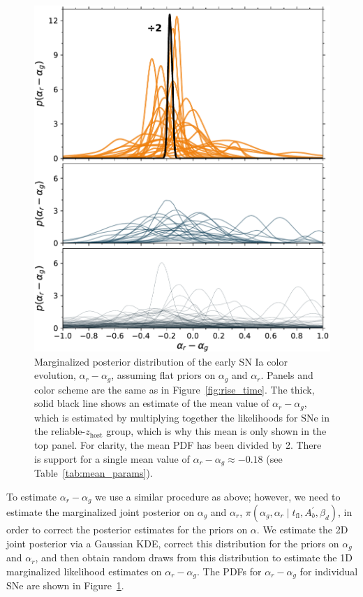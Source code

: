 \documentclass[twocolumn]{./aastex63}
\begin{document}
\begin{figure}
    \centering
    \includegraphics[width=1\linewidth]{./figures/delta.pdf}
    \caption{Marginalized posterior distribution of the early SN Ia color
    evolution, $\alpha_r - \alpha_g$, assuming flat priors on $\alpha_g$ and
    $\alpha_r$. Panels and color scheme are the same as in
    Figure~\ref{fig:rise_time}. The thick, solid black line shows an estimate
    of the mean value of $\alpha_r - \alpha_g$, which is estimated by
    multiplying together the likelihoods for SNe in the
    reliable-$z_\mathrm{host}$ group, which is why this mean is only shown in
    the top panel. For clarity, the mean PDF has been divided by 2. There is
    support for a single mean value of $\alpha_r - \alpha_g \approx -0.18$
    (see Table~\ref{tab:mean_params}).}
    \label{fig:delta}
\end{figure}

To estimate $\alpha_r - \alpha_g$ we use a similar procedure as above;
however, we need to estimate the marginalized joint posterior on $\alpha_g$
and $\alpha_r$, $\pi(\alpha_g,\alpha_r \mid t_\mathrm{fl}, A^\prime_b,
\beta_d)$, in order to correct the posterior estimates for the priors on
$\alpha$. We estimate the 2D joint posterior via a Gaussian KDE, correct this
distribution for the priors on $\alpha_g$ and $\alpha_r$, and then obtain
random draws from this distribution to estimate the 1D marginalized
likelihood estimates on $\alpha_r - \alpha_g$. The PDFs for $\alpha_r -
\alpha_g$ for individual SNe are shown in Figure~\ref{fig:delta}.
\end{document}

